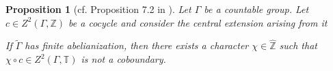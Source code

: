 \documentclass[11pt]{amsart}
\newtheorem{proposition}[theorem]{Proposition}
\theoremstyle{definition}
\theoremstyle{remark}
\theoremstyle{definition}
\begin{document}
\begin{proposition}[cf. Proposition 7.2 in \cite{Dog}] \label{prop:coeff_change}
Let $\Gamma$ be a countable group. Let $c \in Z^2(\Gamma, \mathbb Z)$ be a cocycle and consider the central extension arising from it
\begin{center}
\end{center}
If $\widetilde{\Gamma}$ has finite abelianization, then there exists a character $\chi \in \widehat{\mathbb Z}$ such that
$\chi \circ c \in Z^2(\Gamma, \mathbb{T})$ is not a coboundary.
\end{proposition}
\end{document}
